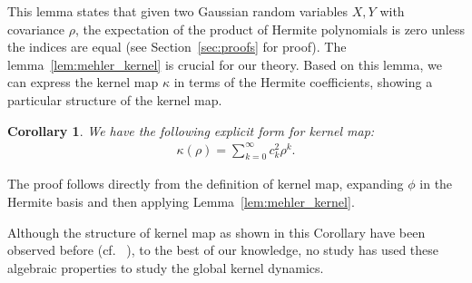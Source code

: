 \documentclass[twoside]{article}
\newcommand{\E}{\mathbb{E}\,}
\newtheorem{corollary}{Corollary}
\theoremstyle{definition}
\newcommand{\thomas}[1]{{\color{blue}TH:  \textit{#1}}}
\begin{document}
This lemma states that given two Gaussian random variables $X, Y$ with covariance $\rho$, the expectation of the product of Hermite polynomials is zero unless the indices are equal (see Section~\ref{sec:proofs} for proof).
The lemma~\ref{lem:mehler_kernel} is crucial for our theory. Based on this lemma, we can express the kernel map $\kappa$ in terms of the Hermite coefficients, showing a particular structure of the kernel map.

\begin{corollary}
    \label{cor:hermite_covariance}
    \label{cor:kernel_map}
We have the following explicit form for kernel map:
\begin{align*}
\kappa(\rho) = \sum_{k=0}^\infty c_k^2 \rho^k.
\end{align*}
\end{corollary}


The proof follows directly from the definition of kernel map, expanding $\phi$ in the Hermite basis and then applying Lemma~\ref{lem:mehler_kernel}. 

Although the structure of kernel map as shown in this Corollary have been observed before (cf. ~\citet{daniely2016toward}), to the best of our knowledge, no study has used these algebraic properties to study the global kernel dynamics. 


\end{document}

